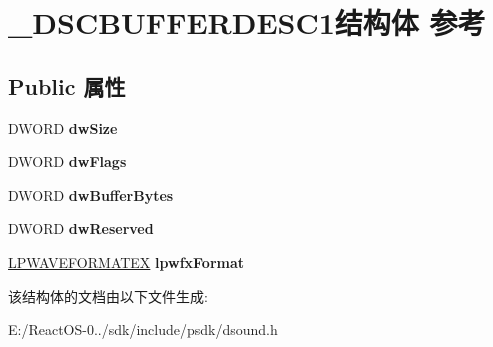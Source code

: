 \hypertarget{struct___d_s_c_b_u_f_f_e_r_d_e_s_c1}{}\section{\+\_\+\+D\+S\+C\+B\+U\+F\+F\+E\+R\+D\+E\+S\+C1结构体 参考}
\label{struct___d_s_c_b_u_f_f_e_r_d_e_s_c1}
\subsection*{Public 属性}
\begin{DoxyCompactItemize}
\item 
\mbox{\label{struct___d_s_c_b_u_f_f_e_r_d_e_s_c1_aa4f2136781d2b7307148743099283e0d}} 
D\+W\+O\+RD {\bfseries dw\+Size}
\item 
\mbox{\label{struct___d_s_c_b_u_f_f_e_r_d_e_s_c1_a164f78a1569d70f19d04629ca30d1e05}} 
D\+W\+O\+RD {\bfseries dw\+Flags}
\item 
\mbox{\label{struct___d_s_c_b_u_f_f_e_r_d_e_s_c1_a405cc9a56118fe6d4d0818361dac7747}} 
D\+W\+O\+RD {\bfseries dw\+Buffer\+Bytes}
\item 
\mbox{\label{struct___d_s_c_b_u_f_f_e_r_d_e_s_c1_a14c5cc2df35c64eeee29b5d24d20c2c8}} 
D\+W\+O\+RD {\bfseries dw\+Reserved}
\item 
\mbox{\label{struct___d_s_c_b_u_f_f_e_r_d_e_s_c1_aecafb3a320cd5a09f7e4b693d25c14a3}} 
\hyperlink{struct___w_a_v_e_f_o_r_m_a_t_e_x}{L\+P\+W\+A\+V\+E\+F\+O\+R\+M\+A\+T\+EX} {\bfseries lpwfx\+Format}
\end{DoxyCompactItemize}


该结构体的文档由以下文件生成\+:\begin{DoxyCompactItemize}
\item 
E\+:/\+React\+O\+S-\/0../sdk/include/psdk/dsound.\+h\end{DoxyCompactItemize}
